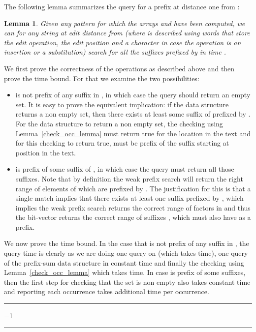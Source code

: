 \documentclass{article}
\newcommand{\?}{\mskip1.5mu}
\newtheorem{lemma}{Lemma}
\newcounter{noqed}
\newcommand{\qed}{ \ifmmode\mbox{
}\fi\rule[-.05em]{.3em}{.7em}\setcounter{noqed}{0}}
\newenvironment{proof}[1][{}]{\noindent{\bf Proof#1.
}\setcounter{noqed}{1}}{\ifnum\value{noqed}=1\qed\fi\par\medskip}
\begin{document}
The following lemma summarizes the query for a prefix  at distance one from : 
\begin{lemma}
\label{modif_pattern_query}
Given any pattern  for which the arrays  and  have been computed, we can for any string  at edit distance  from  (where  is described using  words that store the edit operation, the edit position and a character in case the operation is an insertion or a substitution) search for all the  suffixes prefixed by  in time . 
\end{lemma}
\begin{proof}
We first prove the correctness of the operations as described above and then prove the time bound. For that we examine the two possibilities: 
\begin{itemize}
\item  is not prefix of any suffix in , in which case the query should return an empty set. It is easy to prove the equivalent implication: if the data structure returns a non empty set, then there exists at least some suffix of  prefixed by . For the data structure to return a non empty set, the checking using Lemma~\ref{check_occ_lemma} must return true for the location  in the text and for this checking to return true,  must be prefix of the suffix starting at position  in the text. 
\item  is prefix of some suffix of , in which case the query must return all those suffixes. Note that by definition the weak prefix search  will return the right range of elements of  which are prefixed by . 
The justification for this is that a single match implies that there exists at least one suffix prefixed by , which implies the weak prefix search  returns the correct range of factors in  and thus the bit-vector  returns the correct range of suffixes , which must also have  as a prefix. 
\end{itemize}
We now prove the time bound. In the case that  is not prefix of any suffix in , the query time is clearly  as we are doing one query on  (which takes  time), one query of the prefix-sum data structure  in constant time and finally the checking using Lemma~\ref{check_occ_lemma} which takes  time. In case  is prefix of some suffixes, then the first step for checking that the set is non empty also takes constant time and reporting each occurrence takes additional  time per occurrence. 
\qed
\end{proof}
\end{document}
